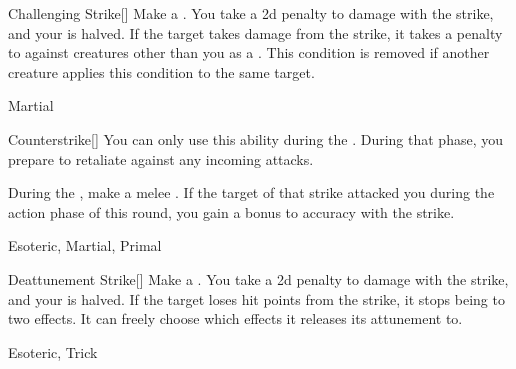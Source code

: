\lowercase{\hypertarget{maneuver:Challenging Strike}{}}\label{maneuver:Challenging Strike}
\hypertarget{maneuver:Challenging Strike}{}
\begin{freeability}[Rank 2]{Challenging Strike}[]
Make a .
You take a \minus2d penalty to damage with the strike, and your  is halved.
If the target takes damage from the strike, it takes a  penalty to  against creatures other than you as a .
This condition is removed if another creature applies this condition to the same target.


 Martial
\end{freeability}
\vspace{0.25em}



\lowercase{\hypertarget{maneuver:Counterstrike}{}}\label{maneuver:Counterstrike}
\hypertarget{maneuver:Counterstrike}{}
\begin{freeability}[Rank 2]{Counterstrike}[]
You can only use this ability during the .
During that phase, you prepare to retaliate against any incoming attacks.

During the , make a melee .
If the target of that strike attacked you during the action phase of this round,
you gain a  bonus to accuracy with the strike.


 Esoteric, Martial, Primal
\end{freeability}
\vspace{0.25em}



\lowercase{\hypertarget{maneuver:Deattunement Strike}{}}\label{maneuver:Deattunement Strike}
\hypertarget{maneuver:Deattunement Strike}{}
\begin{freeability}[Rank 2]{Deattunement Strike}[]
Make a .
You take a \minus2d penalty to damage with the strike, and your  is halved.
If the target loses hit points from the strike, it stops being  to two effects.
It can freely choose which effects it releases its attunement to.


 Esoteric, Trick
\end{freeability}
\vspace{0.25em}



